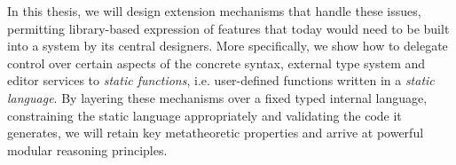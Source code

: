In this thesis, we will design extension mechanisms that handle these issues, permitting library-based expression of features that today would need to be built into a system by its central designers. More specifically, we show how to delegate control over certain aspects of the concrete syntax, external type system and editor services to \emph{static functions}, i.e. user-defined functions written in a \emph{static language}. By layering these mechanisms over a fixed typed internal language, constraining the static language appropriately and validating the code it generates, we will retain key  metatheoretic properties and arrive at powerful modular reasoning principles. %


